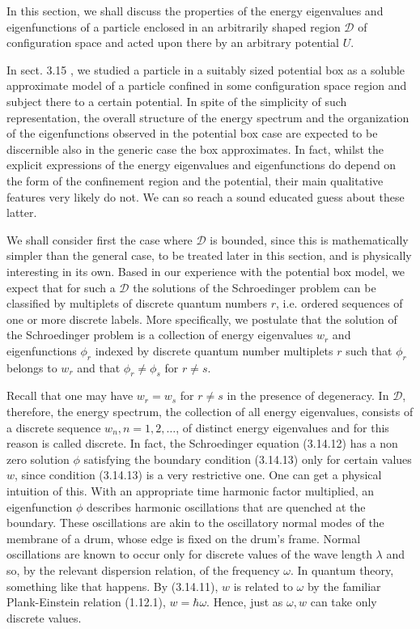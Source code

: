 \documentclass{article}
\begin{document}
In this section, we shall discuss the properties of the energy eigenvalues and eigenfunctions of a particle enclosed in an arbitrarily shaped region $\mathcal{D}$ of configuration space and acted upon there by an arbitrary potential $U$.

In sect. 3.15 , we studied a particle in a suitably sized potential box as a soluble approximate model of a particle confined in some configuration space region and subject there to a certain potential. In spite of the simplicity of such representation, the overall structure of the energy spectrum and the organization of the eigenfunctions observed in the potential box case are expected to be discernible also in the generic case the box approximates. In fact, whilst the explicit expressions of the energy eigenvalues and eigenfunctions do depend on the form of the confinement region and the potential, their main qualitative features very likely do not. We can so reach a sound educated guess about these latter.

We shall consider first the case where $\mathcal{D}$ is bounded, since this is mathematically simpler than the general case, to be treated later in this section, and is physically interesting in its own. Based in our experience with the potential box model, we expect that for such a $\mathcal{D}$ the solutions of the Schroedinger problem can be classified by multiplets of discrete quantum numbers $r$, i.e. ordered sequences of one or more discrete labels. More specifically, we postulate that
the solution of the Schroedinger problem is a collection of energy eigenvalues $w_{r}$ and eigenfunctions $\phi_{r}$ indexed by discrete quantum number multiplets $r$ such that $\phi_{r}$ belongs to $w_{r}$ and that $\phi_{r} \neq \phi_{s}$ for $r \neq s$.

Recall that one may have $w_{r}=w_{s}$ for $r \neq s$ in the presence of degeneracy.
In $\mathcal{D}$, therefore, the energy spectrum, the collection of all energy eigenvalues, consists of a discrete sequence $w_{n}, n=1,2, \ldots$, of distinct energy eigenvalues and for this reason is called discrete. In fact, the Schroedinger equation (3.14.12) has
a non zero solution $\phi$ satisfying the boundary condition (3.14.13) only for certain values $w$, since condition (3.14.13) is a very restrictive one. One can get a physical intuition of this. With an appropriate time harmonic factor multiplied, an eigenfunction $\phi$ describes harmonic oscillations that are quenched at the boundary. These oscillations are akin to the oscillatory normal modes of the membrane of a drum, whose edge is fixed on the drum's frame. Normal oscillations are known to occur only for discrete values of the wave length $\lambda$ and so, by the relevant dispersion relation, of the frequency $\omega$. In quantum theory, something like that happens. By (3.14.11), $w$ is related to $\omega$ by the familiar Plank-Einstein relation (1.12.1), $w=\hbar \omega$. Hence, just as $\omega, w$ can take only discrete values.
\end{document}
